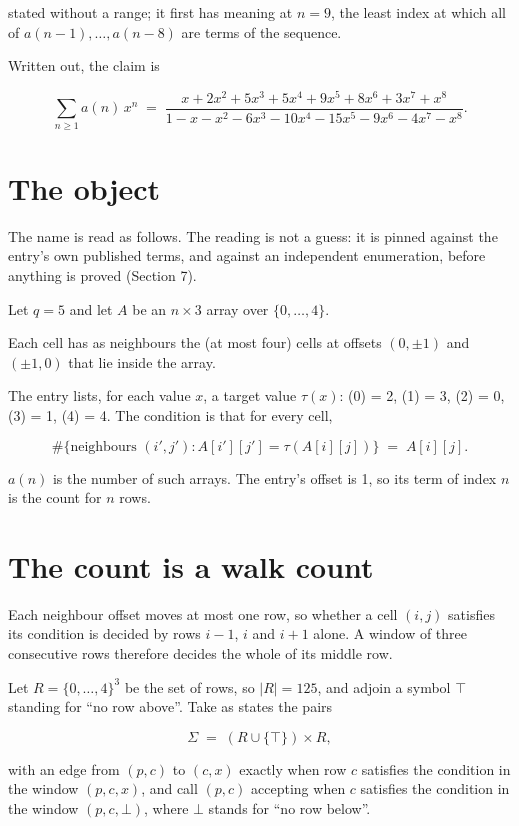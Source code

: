 \documentclass[11pt]{article}
\theoremstyle{definition}
\begin{document}
stated without a range; it first has meaning at $n = 9$, the least index at which all of $a(n-1),\dots,a(n-8)$ are terms of the sequence.

Written out, the claim is

\[\sum_{n \ge 1} a(n)\,x^n \;=\; \frac{x + 2x^{2} + 5x^{3} + 5x^{4} + 9x^{5} + 8x^{6} + 3x^{7} + x^{8}}{1 - x - x^{2} - 6x^{3} - 10x^{4} - 15x^{5} - 9x^{6} - 4x^{7} - x^{8}}.\]

\section{The object}

The name is read as follows. The reading is not a guess: it is pinned against the entry's own published terms, and against an independent enumeration, before anything is proved (Section 7).

Let $q = 5$ and let $A$ be an $n \times 3$ array over $\{0,\dots,4\}$.

Each cell has as neighbours the (at most four) cells at offsets $(0,\pm1)$ and $(\pm1,0)$ that lie inside the array.

The entry lists, for each value $x$, a target value $\tau(x)$: \tau(0) = 2, \tau(1) = 3, \tau(2) = 0, \tau(3) = 1, \tau(4) = 4. The condition is that for every cell,

\[\#\{\text{neighbours } (i',j') : A[i'][j'] = \tau(A[i][j])\} \;=\; A[i][j].\]

$a(n)$ is the number of such arrays. The entry's offset is 1, so its term of index $n$ is the count for $n$ rows.

\section{The count is a walk count}

Each neighbour offset moves at most one row, so whether a cell $(i,j)$ satisfies its condition is decided by rows $i-1$, $i$ and $i+1$ alone. A window of three consecutive rows therefore decides the whole of its middle row.

Let $R = \{0,\dots,4\}^{3}$ be the set of rows, so $|R| = 125$, and adjoin a symbol $\top$ standing for ``no row above''. Take as states the pairs

\[\Sigma \;=\; (R \cup \{\top\}) \times R,\]

with an edge from $(p,c)$ to $(c,x)$ exactly when row $c$ satisfies the condition in the window $(p,c,x)$, and call $(p,c)$ accepting when $c$ satisfies the condition in the window $(p,c,\bot)$, where $\bot$ stands for ``no row below''.
\end{document}
